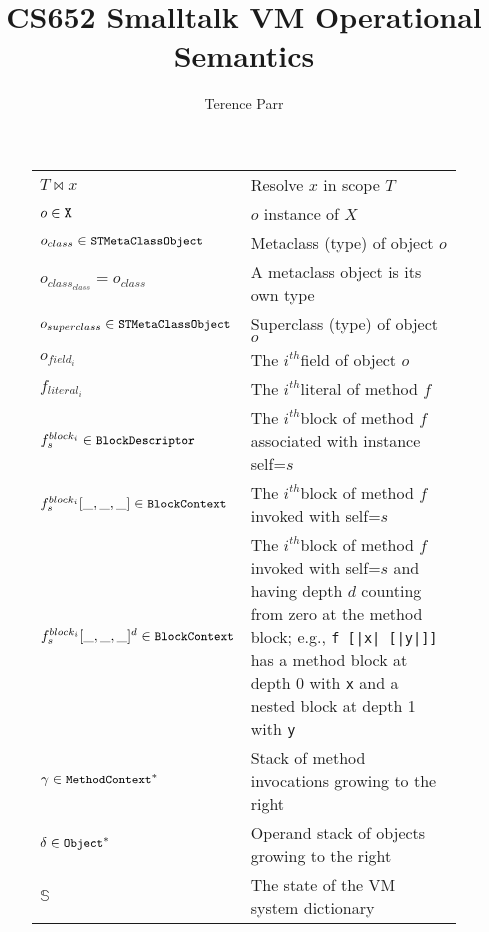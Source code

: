 \documentclass[11pt]{article}
\title{CS652 Smalltalk VM Operational Semantics}
\author{Terence Parr}
\newcommand{\ith}{$i^{th}$}
\begin{document}
\maketitle

\begin{figure}
\begin{center}
\begin{tabular}{l p{8cm}}
$T \bowtie x$ & Resolve $x$ in scope $T$ \\

$o \in \text{\tt X}$ & $o$ instance of $X$\\

$o_{class} \in \text{\tt\small STMetaClassObject}$ & Metaclass (type) of object $o$\\

$o_{class_{class}}=o_{class}$ &  A metaclass object is its own type\\

$o_{superclass} \in \text{\tt\small STMetaClassObject}$ & Superclass (type) of object $o$\\

$o_{field_i}$ & The \ith field of object $o$ \\

$f_{literal_i}$ & The \ith literal of method $f$ \\

$f^{block_i}_s \in \text{\tt\small BlockDescriptor}$ & The \ith block of method $f$ associated with instance self=$s$\\

$f^{block_i}_s[\_,\_,\_] \in \text{\tt\small BlockContext}$ & The \ith block of method $f$ invoked with self=$s$\\

$f^{block_i}_s[\_,\_,\_]^d \in \text{\tt\small BlockContext}$ & The \ith block of method $f$ invoked with self=$s$ and having depth $d$ counting from zero at the method block; e.g., {\tt f [|x| [|y|]]} has a method block at depth 0 with {\tt x} and a nested block at depth 1 with {\tt y} \\

$\gamma \in \text{\tt\small MethodContext}^*$ & Stack of method invocations growing to the right\\

$\delta \in \text{\tt\small Object}^*$ &  Operand stack of objects growing to the right\\

$\mathbb{S}$ & The state of the VM system dictionary\\


\end{tabular}
\end{center}
\end{figure}
\end{document}
